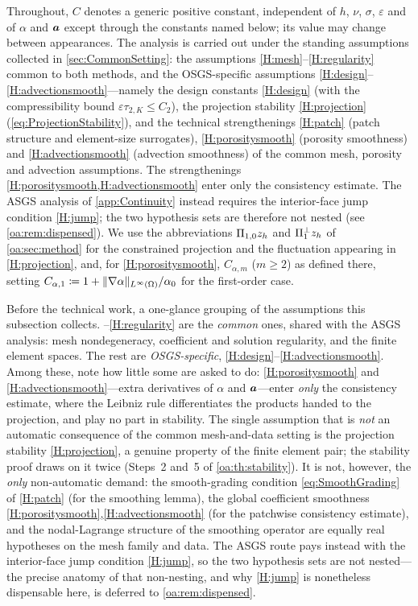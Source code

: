 Throughout, $C$ denotes a generic positive constant, independent of $h$, $\nu$,
$\sigma$, $\varepsilon$ and of $\alpha$ and $\boldsymbol{a}$ except through the constants named
below; its value may change between appearances. The analysis is carried out under the
standing assumptions collected in \cref{sec:CommonSetting}: the assumptions
\cref{H:mesh}--\cref{H:regularity} common to both methods, and the OSGS{\hyp}specific
assumptions \cref{H:design}--\cref{H:advectionsmooth}---namely the design constants
\cref{H:design} (with the compressibility bound $\varepsilon\tau_{2,K}\le C_2$), the projection
stability \cref{H:projection} (\cref{eq:ProjectionStability}), and the technical strengthenings
\cref{H:patch} (patch structure and element{\hyp}size surrogates), \cref{H:porositysmooth}
(porosity smoothness) and \cref{H:advectionsmooth} (advection smoothness) of the common mesh,
porosity and advection assumptions. The strengthenings \cref{H:porositysmooth,H:advectionsmooth}
enter only the consistency estimate. The ASGS analysis of \cref{app:Continuity} instead requires
the interior{\hyp}face jump condition \cref{H:jump}; the two hypothesis sets are therefore not
nested (see \cref{oa:rem:dispensed}). We use the abbreviations $\Pi_{1,0} z_h$ and $\Pi_{1}^{\perp} z_h$ of
\cref{oa:sec:method} for the constrained projection and the fluctuation appearing in
\cref{H:projection}, and, for \cref{H:porositysmooth}, $C_{\alpha,m}$ ($m\ge2$) as defined there,
setting $C_{\alpha,1}\coloneqq 1+\lVert \nabla\alpha \rVert_{L^\infty(\Omega)}/\alpha_0$ for the
first{\hyp}order case.

\begin{pedagogy}
Before the technical work, a one-glance grouping of the assumptions this
subsection collects. --\cref{H:regularity} are the \emph{common}
ones, shared with the ASGS analysis: mesh nondegeneracy, coefficient and
solution regularity, and the finite element spaces. The rest are
\emph{OSGS-specific}, \cref{H:design}--\cref{H:advectionsmooth}. Among these,
note how little some are asked to do: \cref{H:porositysmooth} and
\cref{H:advectionsmooth}---extra derivatives of $\alpha$ and $\boldsymbol{a}$---enter
\emph{only} the consistency estimate, where the Leibniz rule differentiates the
products handed to the projection, and play no part in stability. The single
assumption that is \emph{not} an automatic consequence of the common
mesh-and-data setting is the projection stability \cref{H:projection}, a genuine
property of the finite element pair; the stability proof draws on it twice
(Steps~2 and~5 of \cref{oa:th:stability}). It is not, however, the \emph{only} non-automatic
demand: the smooth{\hyp}grading condition \cref{eq:SmoothGrading} of \cref{H:patch} (for the
smoothing lemma), the global coefficient smoothness \cref{H:porositysmooth},\cref{H:advectionsmooth}
(for the patchwise consistency estimate), and the nodal{\hyp}Lagrange structure of the smoothing
operator are equally real hypotheses on the mesh family and data. The ASGS route pays instead with the
interior-face jump condition \cref{H:jump}, so the two hypothesis sets are not
nested---the precise anatomy of that non-nesting, and why \cref{H:jump} is
nonetheless dispensable here, is deferred to \cref{oa:rem:dispensed}.
\end{pedagogy}

